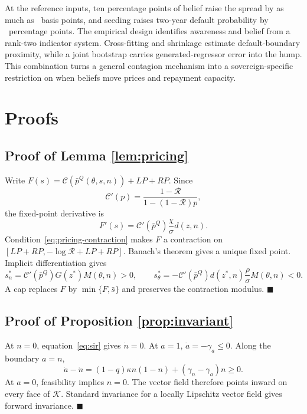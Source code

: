\documentclass[11pt]{article}
\theoremstyle{definition}
\begin{document}
At the reference inputs, ten percentage points of belief raise the spread by as much as \RelPeakTen\ basis points, and seeding raises two-year default probability by \WedgePeak\ percentage points. The empirical design identifies awareness and belief from a rank-two indicator system. Cross-fitting and shrinkage estimate default-boundary proximity, while a joint bootstrap carries generated-regressor error into the hump. This combination turns a general contagion mechanism into a sovereign-specific restriction on when beliefs move prices and repayment capacity.

\clearpage
\appendix
\renewcommand{\theequation}{\thesection.\arabic{equation}}

\section{Proofs}\label{app:proofs}

\subsection{Proof of Lemma \ref{lem:pricing}}
Write $F(s)=\mathcal C(\bar p^Q(\theta,s,n))+LP+RP$. Since
\[
\mathcal C'(p)=\frac{1-\mathcal R}{1-(1-\mathcal R)p},
\]
the fixed-point derivative is
\[
F'(s)=\mathcal C'(\bar p^Q)\frac{\chi}{\sigma}d(z,n).
\]
Condition~\eqref{eq:pricing-contraction} makes $F$ a contraction on $[LP+RP,-\log\mathcal R+LP+RP]$. Banach's theorem gives a unique fixed point. Implicit differentiation gives
\[
s_n^*=\mathcal C'(\bar p^Q)G(z^*)M(\theta,n)>0,
\qquad
s_\theta^*=-\mathcal C'(\bar p^Q)d(z^*,n)\frac{\rho}{\sigma}M(\theta,n)<0.
\]
A cap replaces $F$ by $\min\{F,\bar s\}$ and preserves the contraction modulus. $\blacksquare$

\subsection{Proof of Proposition \ref{prop:invariant}}
At $n=0$, equation~\eqref{eq:sir} gives $\dot n=0$. At $a=1$, $\dot a=-\gamma_a\leq0$. Along the boundary $a=n$,
\[
\dot a-\dot n=(1-q)\kappa n(1-n)+(\gamma_n-\gamma_a)n\geq0.
\]
At $a=0$, feasibility implies $n=0$. The vector field therefore points inward on every face of $\mathcal K$. Standard invariance for a locally Lipschitz vector field gives forward invariance. $\blacksquare$
\end{document}
